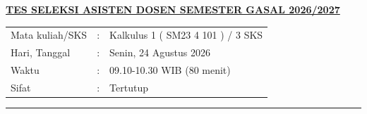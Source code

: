 \documentclass[11pt,openany,a4paper]{article}
\begin{document}
\begin{center}
  {\underline{\textbf{\MakeUppercase{Tes Seleksi Asisten Dosen Semester Gasal 2026/2027}}}}
\end{center}

\begin{center}
  \begin{tabular}{lcl}
    Mata kuliah/SKS & : & Kalkulus 1 ( SM23 4 101 ) / 3 SKS \\
    Hari, Tanggal   & : & Senin, 24 Agustus 2026            \\
    Waktu           & : & 09.10-10.30 WIB (80 menit)        \\
    Sifat           & : & Tertutup
  \end{tabular}
\end{center}

\noindent\rule{\textwidth}{2.pt}
\end{document}
